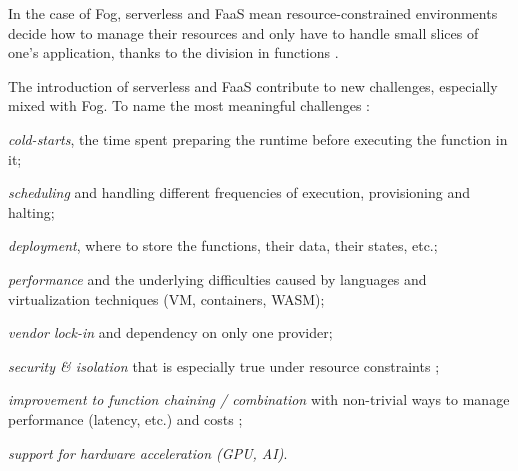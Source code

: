 \documentclass[11pt]{sdm}
\begin{document}
In the case of Fog, serverless and \gls{FaaS} mean resource-constrained environments decide how to manage their resources and only have to handle small slices of one's application, thanks to the division in functions \cite{bermbach_auctionwhisk_2021}.

The introduction of serverless and \gls{FaaS} contribute to new challenges, especially mixed with Fog. To name the most meaningful challenges \cite{kjorveziroski_iot_2021}:
\begin{enumerate*}
	\item \emph{cold-starts}, the time spent preparing the runtime before executing the function in it;
	\item \emph{scheduling} and handling different frequencies of execution, provisioning and halting;
	\item \emph{deployment}, where to store the functions, their data, their states, etc.;
	\item \emph{performance} and the underlying difficulties caused by languages and virtualization techniques (\gls{VM}, containers, WASM);
	\item \emph{vendor lock-in} and dependency on only one provider;
	\item \emph{security \& isolation} that is especially true under resource constraints \cite{maurice_hello_2017};
	\item \emph{improvement to function chaining / combination} with non-trivial ways to manage performance (latency, etc.) and costs \cite{elgamal_costless_2018};
	\item \emph{support for hardware acceleration (\gls{GPU}, \gls{AI})}.
\end{enumerate*}

%
\end{document}
